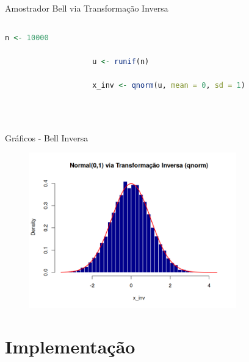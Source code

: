 \documentclass{beamer} %
\begin{document}
	\begin{frame}[fragile]{Amostrador Bell via Transformação Inversa}
		\begin{columns}
			
			\begin{column}{0.85\textwidth}
				\begin{lstlisting}[language=R]
					n <- 10000
					
					u <- runif(n)
					
					x_inv <- qnorm(u, mean = 0, sd = 1)
					
							
				\end{lstlisting}
			\end{column}
			
			\begin{column}{0.15\textwidth}
				\href{https://github.com/andresavassi/Trabalho-1---MCCD-II/blob/main/bell_inversa.R}{}
				
				\vspace{0.5cm}
				
			\end{column}
			
		\end{columns}
	\end{frame}
	
	\begin{frame}{Gráficos - Bell Inversa}
	\begin{figure}[h]
		\centering
		\includegraphics[width=0.8\textwidth]{graf_bell_inv.png}
		\label{fig:boxplot}
	\end{figure}
\end{frame}
	

\section{Implementação}
	
\end{document}
